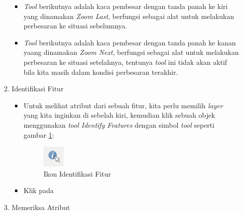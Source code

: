 \begin{enumerate}[A.]
\begin{enumerate}[1.]
\begin{itemize}
    \item \textit{Tool} berikutnya adalah kaca pembesar dengan tanda panah ke kiri yang dinamakan \textit{Zoom Last}, berfungsi sebagai alat untuk melakukan perbesaran ke situasi sebelumnya. 
    
    \item \textit{Tool} berikutnya adalah kaca pembesar dengan tanda panah ke kanan yaang dinamakan \textit{Zoom Next}, berfungsi sebagai alat untuk melakukan perbesaran ke situasi setelahnya, tentunya \textit{tool} ini tidak akan aktif bila kita masih dalam kondisi perbesaran terakhir.
 
  \end{itemize}
  
  \item Identifikasi Fitur
  
  \begin{itemize}
  
    \item Untuk melihat atribut dari sebuah fitur, kita perlu memilih \textit{layer} yang kita inginkan di sebelah kiri, kemudian klik sebuah objek menggunakan \textit{tool Identify Features} dengan simbol \textit{tool} seperti gambar \ref{fig:identifyfeaturesicon}:
    
    \begin{figure}[H]
      \centering
      \includegraphics[scale=1]{./resources/011-identify-features-icon}
      \caption{Ikon Identifikasi Fitur}
      \label{fig:identifyfeaturesicon}
    \end{figure}
    
    \item Klik pada 
  
  \end{itemize}
  
  \item Memeriksa Atribut
  
\end{enumerate}

\end{enumerate}